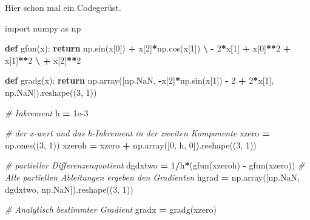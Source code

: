 \documentclass[
]{book}
\newenvironment{Shaded}{\begin{snugshade}}{\end{snugshade}}
\newcommand{\CommentTok}[1]{\textcolor[rgb]{0.56,0.35,0.01}{\textit{#1}}}
\newcommand{\ControlFlowTok}[1]{\textcolor[rgb]{0.13,0.29,0.53}{\textbf{#1}}}
\newcommand{\DecValTok}[1]{\textcolor[rgb]{0.00,0.00,0.81}{#1}}
\newcommand{\FloatTok}[1]{\textcolor[rgb]{0.00,0.00,0.81}{#1}}
\newcommand{\ImportTok}[1]{#1}
\newcommand{\KeywordTok}[1]{\textcolor[rgb]{0.13,0.29,0.53}{\textbf{#1}}}
\newcommand{\NormalTok}[1]{#1}
\newcommand{\OperatorTok}[1]{\textcolor[rgb]{0.81,0.36,0.00}{\textbf{#1}}}
\theoremstyle{definition}
\theoremstyle{definition}
\theoremstyle{definition}
\theoremstyle{definition}
\theoremstyle{remark}
\begin{document}
Hier schon mal ein Codegerüst.

\begin{Shaded}
\begin{Highlighting}[]
\ImportTok{import}\NormalTok{ numpy }\ImportTok{as}\NormalTok{ np}
 
\KeywordTok{def}\NormalTok{ gfun(x):}
    \ControlFlowTok{return}\NormalTok{ np.sin(x[}\DecValTok{0}\NormalTok{]) }\OperatorTok{+}\NormalTok{ x[}\DecValTok{2}\NormalTok{]}\OperatorTok{*}\NormalTok{np.cos(x[}\DecValTok{1}\NormalTok{]) }\OperatorTok{\textbackslash{}}
        \OperatorTok{{-}} \DecValTok{2}\OperatorTok{*}\NormalTok{x[}\DecValTok{1}\NormalTok{] }\OperatorTok{+}\NormalTok{ x[}\DecValTok{0}\NormalTok{]}\OperatorTok{**}\DecValTok{2} \OperatorTok{+}\NormalTok{ x[}\DecValTok{1}\NormalTok{]}\OperatorTok{**}\DecValTok{2} \OperatorTok{\textbackslash{}}
        \OperatorTok{+}\NormalTok{ x[}\DecValTok{2}\NormalTok{]}\OperatorTok{**}\DecValTok{2}

\KeywordTok{def}\NormalTok{ gradg(x):}
    \ControlFlowTok{return}\NormalTok{ np.array([np.NaN,}
                     \OperatorTok{{-}}\NormalTok{x[}\DecValTok{2}\NormalTok{]}\OperatorTok{*}\NormalTok{np.sin(x[}\DecValTok{1}\NormalTok{]) }\OperatorTok{{-}} \DecValTok{2} \OperatorTok{+} \DecValTok{2}\OperatorTok{*}\NormalTok{x[}\DecValTok{1}\NormalTok{],}
\NormalTok{                     np.NaN]).reshape((}\DecValTok{3}\NormalTok{, }\DecValTok{1}\NormalTok{))}

\CommentTok{\# Inkrement}
\NormalTok{h }\OperatorTok{=} \FloatTok{1e{-}3}

\CommentTok{\# der x{-}wert und das h{-}Inkrement in der zweiten Komponente}
\NormalTok{xzero }\OperatorTok{=}\NormalTok{ np.ones((}\DecValTok{3}\NormalTok{, }\DecValTok{1}\NormalTok{))}
\NormalTok{xzeroh }\OperatorTok{=}\NormalTok{ xzero }\OperatorTok{+}\NormalTok{ np.array([}\DecValTok{0}\NormalTok{, h, }\DecValTok{0}\NormalTok{]).reshape((}\DecValTok{3}\NormalTok{, }\DecValTok{1}\NormalTok{))}

\CommentTok{\# partieller Differenzenquotient}
\NormalTok{dgdxtwo }\OperatorTok{=} \DecValTok{1}\OperatorTok{/}\NormalTok{h}\OperatorTok{*}\NormalTok{(gfun(xzeroh) }\OperatorTok{{-}}\NormalTok{ gfun(xzero))}
\CommentTok{\# Alle partiellen Ableitungen ergeben den Gradienten}
\NormalTok{hgrad }\OperatorTok{=}\NormalTok{ np.array([np.NaN, dgdxtwo, np.NaN]).reshape((}\DecValTok{3}\NormalTok{, }\DecValTok{1}\NormalTok{))}

\CommentTok{\# Analytisch bestimmter Gradient}
\NormalTok{gradx }\OperatorTok{=}\NormalTok{ gradg(xzero)}


\end{Highlighting}
\end{Shaded}
\end{document}
